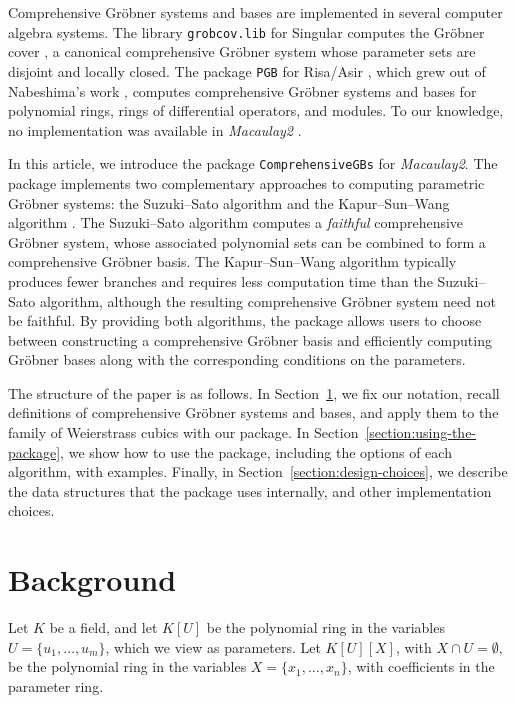 \documentclass[11pt]{amsart}
\theoremstyle{plain}
\theoremstyle{definition}
\theoremstyle{remark}
\begin{document}
Comprehensive Gröbner systems and bases are implemented in several computer algebra systems. The library \texttt{grobcov.lib} for Singular \cite{greuel2001singular,montes2012software} computes the Gröbner cover \cite{montes2010grobner}, a canonical comprehensive Gröbner system whose parameter sets are disjoint and locally closed. The package \texttt{PGB} for Risa/Asir \cite{noro1992risa,nabeshima2007pgb}, which grew out of Nabeshima's work \cite{Nabeshima}, computes comprehensive Gröbner systems and bases for polynomial rings, rings of differential operators, and modules. To our knowledge, no implementation was available in \emph{Macaulay2} \cite{M2}.

In this article, we introduce the package \texttt{ComprehensiveGBs} for \emph{Macaulay2}.
The package implements two complementary approaches to computing parametric Gröbner systems: the Suzuki--Sato algorithm \cite{SS} and the Kapur--Sun--Wang algorithm \cite{KAPUR201327}. The Suzuki--Sato algorithm computes a \emph{faithful} comprehensive Gröbner system, whose associated polynomial sets can be combined to form a comprehensive Gröbner basis. The Kapur--Sun--Wang algorithm typically produces fewer branches and requires less computation time than the Suzuki--Sato algorithm, although the resulting comprehensive Gröbner system need not be faithful. By providing both algorithms, the package allows users to choose between constructing a comprehensive Gröbner basis and efficiently computing Gröbner bases along with the corresponding conditions on the parameters.

The structure of the paper is as follows. In Section~\ref{section:background}, we fix our notation, recall definitions of comprehensive Gröbner systems and bases, and apply them to the family of Weierstrass cubics with our package. In Section~\ref{section:using-the-package}, we show how to use the package, including the options of each algorithm, with examples. Finally, in Section~\ref{section:design-choices}, we describe the data structures that the package uses internally, and other implementation choices.

\section{Background}\label{section:background}

Let $K$ be a field, and let $K[U]$ be the polynomial ring in the variables $ U=\{u_1,\ldots,u_m\}$, which we view as parameters. Let
$K[U][X]$, with $X\cap U=\emptyset$, be
the polynomial ring in the variables $X=\{x_1,\ldots,x_n\}$, with coefficients in the parameter ring.
\end{document}
